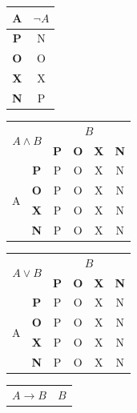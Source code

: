 \documentclass[11pt]{article}
\begin{document}
    \begin{center}
        \begin{tabular}{|c|c|}
            \hline
            A & $\neg A$ \\
            \hline
            \textbf{P} & N \\
            \hline
            \textbf{O} & O \\
            \hline
            \textbf{X} & X \\
            \hline
            \textbf{N} & P \\
            \hline
        \end{tabular}
        \begin{tabular}{|c|c|c|c|c|c|}
            \hline
            \multicolumn{2}{|c|}{\multirow{2}{*}{$A \wedge B$}} & \multicolumn{4}{|c|}{$B$} \\
            \cline{3-6}
            & & \textbf{P} & \textbf{O} & \textbf{X} & \textbf{N} \\
            \hline
            \multirow{4}{*}{A} & \textbf{P} & P & O & X & N \\
            \cline{2-6}
            & \textbf{O} & P & O & X & N \\
            \cline{2-6}
            & \textbf{X} & P & O & X & N \\
            \cline{2-6}
            & \textbf{N} & P & O & X & N \\
            \hline
        \end{tabular}
        \begin{tabular}{|c|c|c|c|c|c|}
            \hline
            \multicolumn{2}{|c|}{\multirow{2}{*}{$A \vee B$}} & \multicolumn{4}{|c|}{$B$}\\
            \cline{3-6}
            & & \textbf{P} & \textbf{O} & \textbf{X} & \textbf{N} \\
            \hline
            \multirow{4}{*}{A} & \textbf{P} & P & O & X & N \\
            \cline{2-6}
            & \textbf{O} & P & O & X & N \\
            \cline{2-6}
            & \textbf{X} & P & O & X & N \\
            \cline{2-6}
            & \textbf{N} & P & O & X & N \\
            \hline
        \end{tabular}
        \begin{tabular}{|c|c|c|c|c|c|}
            \hline
            \multicolumn{2}{|c|}{\multirow{2}{*}{$A \rightarrow B$}} & \multicolumn{4}{|c|}{$B$}\\

\end{tabular}
\end{center}
\end{document}
